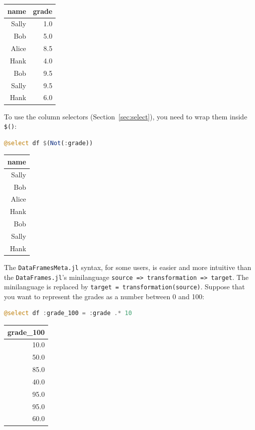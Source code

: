 \documentclass[
  notoc %
]{tufte-book}
\newcommand{\passthrough}[1]{#1}
\begin{document}
\begin{longtable}[]{@{}rr@{}}
\toprule
name & grade \\
\midrule
\endhead
Sally & 1.0 \\
Bob & 5.0 \\
Alice & 8.5 \\
Hank & 4.0 \\
Bob & 9.5 \\
Sally & 9.5 \\
Hank & 6.0 \\
\bottomrule
\end{longtable}

To use the column selectors (Section~\ref{sec:select}), you need to wrap
them inside \passthrough{\lstinline!$()!}:

\begin{lstlisting}[language=Julia]
@select df $(Not(:grade))
\end{lstlisting}

\begin{longtable}[]{@{}r@{}}
\toprule
name \\
\midrule
\endhead
Sally \\
Bob \\
Alice \\
Hank \\
Bob \\
Sally \\
Hank \\
\bottomrule
\end{longtable}

The \passthrough{\lstinline!DataFramesMeta.jl!} syntax, for some users,
is easier and more intuitive than the
\passthrough{\lstinline!DataFrames.jl!}'s minilanguage
\passthrough{\lstinline!source => transformation => target!}. The
minilanguage is replaced by
\passthrough{\lstinline!target = transformation(source)!}. Suppose that
you want to represent the grades as a number between 0 and 100:

\begin{lstlisting}[language=Julia]
@select df :grade_100 = :grade .* 10
\end{lstlisting}

\begin{longtable}[]{@{}r@{}}
\toprule
grade\_100 \\
\midrule
\endhead
10.0 \\
50.0 \\
85.0 \\
40.0 \\
95.0 \\
95.0 \\
60.0 \\
\bottomrule
\end{longtable}
\end{document}
